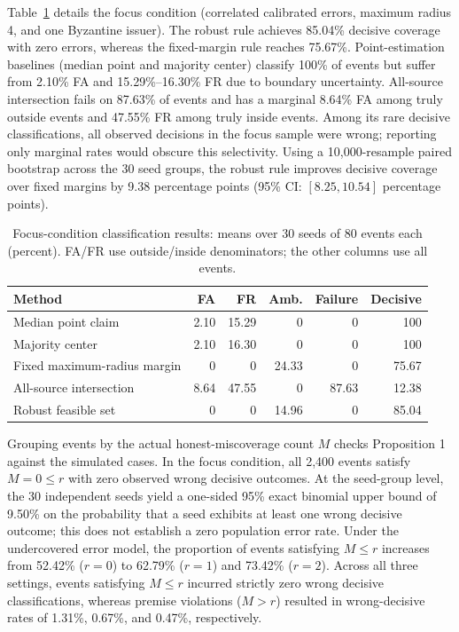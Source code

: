 \documentclass[pdflatex,iicol,sn-mathphys-num]{sn-jnl}
\theoremstyle{thmstyleone}
\begin{document}
Table~\ref{tab:semantic} details the focus condition (correlated calibrated errors, maximum radius 4, and one Byzantine issuer). The robust rule achieves 85.04\% decisive coverage with zero errors, whereas the fixed-margin rule reaches 75.67\%. Point-estimation baselines (median point and majority center) classify 100\% of events but suffer from 2.10\% FA and 15.29\%--16.30\% FR due to boundary uncertainty. All-source intersection fails on 87.63\% of events and has a marginal 8.64\% FA among truly outside events and 47.55\% FR among truly inside events. Among its rare decisive classifications, all observed decisions in the focus sample were wrong; reporting only marginal rates would obscure this selectivity. Using a 10,000-resample paired bootstrap across the 30 seed groups, the robust rule improves decisive coverage over fixed margins by 9.38 percentage points (95\% CI: $[8.25, 10.54]$ percentage points).



\begin{table}[t]\centering\small
\caption{Focus-condition classification results: means over 30 seeds of 80 events each (percent). FA/FR use outside/inside denominators; the other columns use all events.}\label{tab:semantic}
\begin{tabular}{lrrrrr}\toprule
Method&FA&FR&Amb.&Failure&Decisive\\\midrule
Median point claim&2.10&15.29&0&0&100\\
Majority center&2.10&16.30&0&0&100\\
Fixed maximum-radius margin&0&0&24.33&0&75.67\\
All-source intersection&8.64&47.55&0&87.63&12.38\\
Robust feasible set&0&0&14.96&0&85.04\\\bottomrule
\end{tabular}\end{table}

Grouping events by the actual honest-miscoverage count $M$ checks Proposition 1 against the simulated cases. In the focus condition, all 2,400 events satisfy $M = 0 \le r$ with zero observed wrong decisive outcomes. At the seed-group level, the 30 independent seeds yield a one-sided 95\% exact binomial upper bound of 9.50\% on the probability that a seed exhibits at least one wrong decisive outcome; this does not establish a zero population error rate. Under the undercovered error model, the proportion of events satisfying $M \le r$ increases from 52.42\% ($r = 0$) to 62.79\% ($r = 1$) and 73.42\% ($r = 2$). Across all three settings, events satisfying $M \le r$ incurred strictly zero wrong decisive classifications, whereas premise violations ($M > r$) resulted in wrong-decisive rates of 1.31\%, 0.67\%, and 0.47\%, respectively.
\end{document}

